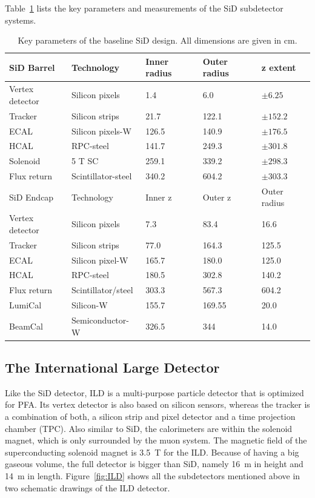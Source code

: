 Table~\ref{tab:KeyParametersSiD} lists the key parameters and measurements of the SiD subdetector systems.

\begin{table}
\caption{Key parameters of the baseline SiD design. All dimensions are given in cm.\cite{SiDBkgNote}}
\label{tab:KeyParametersSiD}
\centering
\begin{tabularx}{0.81\textwidth}{l|llll}
\hline\hline
SiD Barrel & Technology & Inner radius & Outer radius & z extent\\
\hline
Vertex detector & Silicon pixels & 1.4 & 6.0 & $\pm 6.25$ \\
Tracker & Silicon strips & 21.7 & 122.1 & $\pm 152.2$ \\
ECAL & Silicon pixels-W & 126.5 & 140.9 & $\pm 176.5$ \\
HCAL & RPC-steel & 141.7 & 249.3 & $\pm 301.8$ \\
Solenoid & 5 T SC & 259.1 & 339.2 & $\pm 298.3$ \\
Flux return & Scintillator-steel & 340.2 & 604.2 & $\pm 303.3$ \\
\hline
SiD Endcap & Technology & Inner z & Outer z & Outer radius\\
\hline
Vertex detector & Silicon pixels & 7.3 & 83.4 & 16.6 \\
Tracker & Silicon strips & 77.0 & 164.3 & 125.5 \\
ECAL & Silicon pixel-W & 165.7 & 180.0 & 125.0 \\
HCAL & RPC-steel & 180.5 & 302.8 & 140.2 \\
Flux return & Scintillator/steel & 303.3 & 567.3 & 604.2 \\
LumiCal & Silicon-W & 155.7 & 169.55 &  20.0 \\
BeamCal & Semiconductor-W & 326.5 & 344 & 14.0 \\
\hline\hline
\end{tabularx}
\end{table}

\subsection{The International Large Detector}

Like the SiD detector, ILD is a multi-purpose particle detector that is optimized for PFA.
Its vertex detector is also based on silicon sensors, whereas the tracker is a combination of both, a silicon strip and pixel detector and a time projection chamber (TPC).
Also similar to SiD, the calorimeters are within the solenoid magnet, which is only surrounded by the muon system.
The magnetic field of the superconducting solenoid magnet is \SI{3.5}{T} for the ILD.
Because of having a big gaseous volume, the full detector is bigger than SiD, namely \SI{16}{m} in height and \SI{14}{m} in length.
Figure~\ref{fig:ILD} shows all the subdetectors mentioned above in two schematic drawings of the ILD detector.

